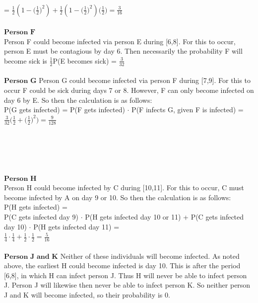 \documentclass[12pt]{article}
\begin{document}
\\ = $\frac{1}{2}(1 - \big( \frac{1}{2} \big)^2) + \frac{1}{2}(1 - \big(\frac{1}{2} \big)^2) \big( \frac{1}{2} \big) = \frac{3}{16}$
\\
\\
$\textbf{Person F}$\\
Person F could become infected via person E during [6,8]. For this to occur, person E must be contagious by day 6. Then necessarily the probability F will become sick is $\frac{1}{2}$P(E becomes sick) = $\frac{3}{32}$
\\
\\
$\textbf{Person G}$
Person G could become infected via person F during [7,9]. For this to occur F could be sick during days 7 or 8. However, F can only become infected on day 6 by E. So then the calculation is as follows: \\
P(G gets infected) = P(F gets infected) $\cdot$ P(F infects G, given F is infected) = $\frac{3}{32} \big(\frac{1}{2} + \big( \frac{1}{2} \big )^2 \big) = \frac{9}{128}$ 
\\
\\ 
\\
\\ 
\\
\\
$\textbf{Person H}$ \\
Person H could become infected by C during [10,11]. For this to occur, C must become infected by A on day 9 or 10. So then the calculation is as follows:
\\
P(H gets infected) = \\ P(C gets infected day 9) $\cdot$ P(H gets infected day 10 or 11) + P(C gets infected day 10) $\cdot$ P(H gets infected day 11) = \\ $\frac{1}{4} \cdot \frac{1}{4} + \frac{1}{2} \cdot \frac{1}{2} = \frac{5}{16}$
\\
\\
$\textbf{Person J and K}$
Neither of these individuals will become infected. As noted above, the earliest H could become infected is day 10. This is after the period [6,8], in which H can infect person J. Thus H will never be able to infect person J. Person J will likewise then never be able to infect person K. So neither person J and K will become infected, so their probability is 0.
\end{document}
